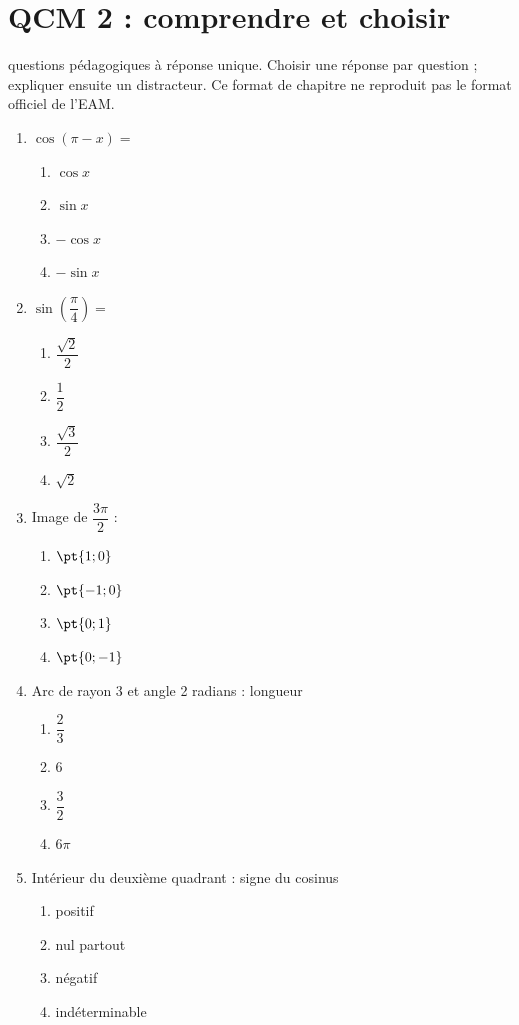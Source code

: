 \endgroup
\begingroup\small
{}\section*{QCM 2 : comprendre et choisir}\label{C10-Q2}
 questions pédagogiques à réponse unique. Choisir une réponse par question ; expliquer ensuite un distracteur. Ce format de chapitre ne reproduit pas le format officiel de l’EAM.
\begin{enumerate}
\item $\cos(\pi-x)=$
\begin{enumerate}[label=\Alph*.,itemsep=2pt]
\item $\cos x$
\item $\sin x$
\item $-\cos x$
\item $-\sin x$
\end{enumerate}
\item $\sin (\dfrac{\pi}{4})=$
\begin{enumerate}[label=\Alph*.,itemsep=2pt]
\item $\dfrac{\sqrt 2}{2}$
\item $\dfrac{1}{2}$
\item $\dfrac{\sqrt 3}{2}$
\item $\sqrt2$
\end{enumerate}
\item Image de $\dfrac{3\pi}{2}$ :
\begin{enumerate}[label=\Alph*.,itemsep=2pt]
\item $\pt{1;0}$
\item $\pt{-1;0}$
\item $\pt{0;1}$
\item $\pt{0;-1}$
\end{enumerate}
\item Arc de rayon 3 et angle 2 radians : longueur
\begin{enumerate}[label=\Alph*.,itemsep=2pt]
\item $\dfrac{2}{3}$
\item $6$
\item $\dfrac{3}{2}$
\item $6\pi$
\end{enumerate}
\item Intérieur du deuxième quadrant : signe du cosinus
\begin{enumerate}[label=\Alph*.,itemsep=2pt]
\item positif
\item nul partout
\item négatif
\item indéterminable
\end{enumerate}
\end{enumerate}
